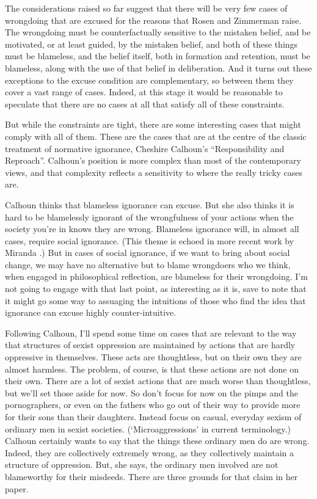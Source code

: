 The considerations raised so far suggest that there will be very few cases of wrongdoing that are excused for the reasons that Rosen and Zimmerman raise. The wrongdoing must be counterfactually sensitive to the mistaken belief, and be motivated, or at least guided, by the mistaken belief, and both of these things must be blameless, and the belief itself, both in formation and retention, must be blameless, along with the use of that belief in deliberation. And it turns out these exceptions to the excuse condition are complementary, so between them they cover a vast range of cases. Indeed, at this stage it would be reasonable to speculate that there are no cases at all that satisfy all of these constraints.

But while the constraints are tight, there are some interesting cases that might comply with all of them. These are the cases that are at the centre of the classic treatment of normative ignorance, Cheshire Calhoun's ``Responsibility and Reproach''. Calhoun's position is more complex than most of the contemporary views, and that complexity reflects a sensitivity to where the really tricky cases are.

Calhoun thinks that blameless ignorance can excuse. But she also thinks it is hard to be blamelessly ignorant of the wrongfulness of your actions when the society you're in knows they are wrong. Blameless ignorance will, in almost all cases, require social ignorance. (This theme is echoed in more recent work by Miranda \citet{Fricker2010}.) But in cases of social ignorance, if we want to bring about social change, we may have no alternative but to blame wrongdoers who we think, when engaged in philosophical reflection, are blameless for their wrongdoing. I'm not going to engage with that last point, as interesting as it is, save to note that it might go some way to assuaging the intuitions of those who find the idea that ignorance can excuse highly counter-intuitive.

Following Calhoun, I'll spend some time on cases that are relevant to the way that structures of sexist oppression are maintained by actions that are hardly oppressive in themselves. These acts are thoughtless, but on their own they are almost harmless. The problem, of course, is that these actions are not done on their own. There are a lot of sexist actions that are much worse than thoughtless, but we'll set those aside for now. So don't focus for now on the pimps and the pornographers, or even on the fathers who go out of their way to provide more for their sons than their daughters. Instead focus on casual, everyday sexism of ordinary men in sexist societies. (`Microaggressions' in current terminology.) Calhoun certainly wants to say that the things these ordinary men do are wrong. Indeed, they are collectively extremely wrong, as they collectively maintain a structure of oppression. But, she says, the ordinary men involved are not blameworthy for their misdeeds. There are three grounds for that claim in her paper.

